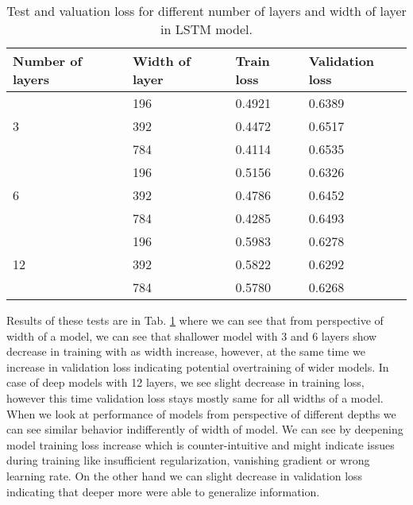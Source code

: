 \begin{table}[!h]
	\centering
	\begin{tabular}{|l|l|l|l|}
		\hline
		Number of layers    & Width of layer & Train loss & Validation loss \\ \hline
		\multirow{3}{*}{3}  & 196               &  0.4921         & 0.6389                \\ \cline{2-4} 
		& 392              &  0.4472         & 0.6517                \\ \cline{2-4} 
		& 784              & 0.4114          & 0.6535                \\ \hline
		\multirow{3}{*}{6}  & 196               & 0.5156          & 0.6326                \\ \cline{2-4} 
		& 392              & 0.4786          &   0.6452              \\ \cline{2-4} 
		& 784              & 0.4285          &  0.6493               \\ \hline
		\multirow{3}{*}{12} & 196               & 0.5983          & 0.6278                \\ \cline{2-4} 
		& 392              & 0.5822          & 0.6292                \\ \cline{2-4} 
		& 784              & 0.5780          & 0.6268                \\ \hline
	\end{tabular}
	\caption{Test and valuation loss for different number of layers and width of layer in LSTM model.}
	\label{tab:lstm_train}
\end{table}

Results of these tests are in Tab. \ref{tab:lstm_train} where we can see that from perspective of width of a model, we can see that shallower model with 3 and 6 layers show decrease in training with as width increase, however, at the same time we increase in validation loss indicating potential overtraining of wider models. In case of deep models with 12 layers, we see slight decrease in training loss, however this time validation loss stays mostly same for all widths of a model. 
\\

When we look at performance of models from perspective of different depths we can see similar behavior indifferently of width of model. We can see by deepening model training loss increase which is counter-intuitive and might indicate issues during training like insufficient regularization, vanishing gradient or wrong learning rate. On the other hand we can slight decrease in validation loss indicating that deeper more were able to generalize information.
\\

